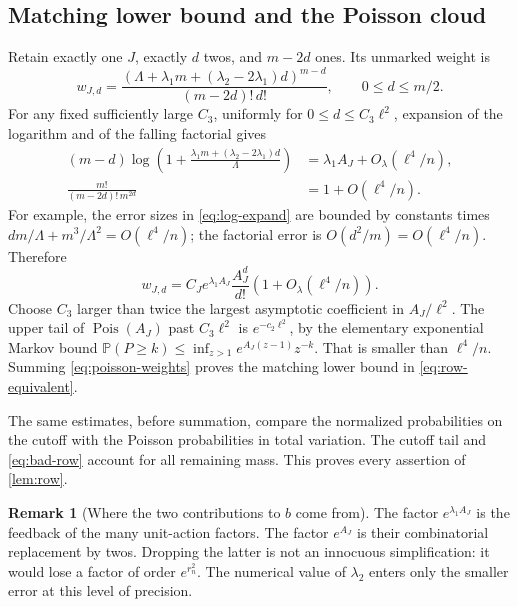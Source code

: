 \documentclass[11pt,a4paper]{article}
\theoremstyle{definition}
\newtheorem{remark}[theorem]{Remark}
\newcommand{\Prob}{\mathbb P}
\newcommand{\Pois}{\operatorname{Pois}}
\numberwithin{equation}{section}
\begin{document}
\subsection{Matching lower bound and the Poisson cloud}
Retain exactly one \(J\), exactly \(d\) twos, and \(m-2d\) ones. Its
unmarked weight is
\begin{equation}
 w_{J,d}=\frac{\left(\Lambda+\lambda_1m
                          +(\lambda_2-2\lambda_1)d\right)^{m-d}}
                    {(m-2d)!\,d!},\qquad 0\le d\le m/2.
 \label{eq:exact-good-weight}
\end{equation}
For any fixed sufficiently large \(C_3\), uniformly for
\(0\le d\le C_3\ell^2\), expansion of the logarithm and of the falling
factorial gives
\begin{align}
 (m-d)\log\!\left(1+
        \frac{\lambda_1m+(\lambda_2-2\lambda_1)d}{\Lambda}\right)
   &=\lambda_1A_J+O_\lambda(\ell^4/n),\label{eq:log-expand}\\
 \frac{m!}{(m-2d)!\,m^{2d}}
   &=1+O(\ell^4/n).\label{eq:falling-expand}
\end{align}
For example, the error sizes in \eqref{eq:log-expand} are bounded by constants
times \(dm/\Lambda+m^3/\Lambda^2=O(\ell^4/n)\); the factorial error is
\(O(d^2/m)=O(\ell^4/n)\). Therefore
\begin{equation}
 w_{J,d}=C_Je^{\lambda_1A_J}\frac{A_J^d}{d!}
            \left(1+O_\lambda(\ell^4/n)\right).
 \label{eq:poisson-weights}
\end{equation}
Choose \(C_3\) larger than twice the largest asymptotic coefficient in
\(A_J/\ell^2\). The upper tail of \(\Pois(A_J)\) past \(C_3\ell^2\)
is \(e^{-c_2\ell^2}\), by the elementary exponential Markov bound
\(\Prob(P\ge k)\le\inf_{z>1}e^{A_J(z-1)}z^{-k}\).
That is smaller than \(\ell^4/n\). Summing \eqref{eq:poisson-weights}
proves the matching lower bound in \eqref{eq:row-equivalent}.

The same estimates, before summation, compare the normalized probabilities
on the cutoff with the Poisson probabilities in total variation. The cutoff
tail and \eqref{eq:bad-row} account for all remaining mass. This proves every
assertion of \cref{lem:row}.

\begin{remark}[Where the two contributions to \(b\) come from]
The factor \(e^{\lambda_1A_J}\) is the feedback of the many unit-action
factors. The factor \(e^{A_J}\) is their combinatorial replacement by twos.
Dropping the latter is not an innocuous simplification: it would lose a
factor of order \(e^{r_n^2}\). The numerical value of \(\lambda_2\) enters
only the smaller error at this level of precision.
\end{remark}
\end{document}

